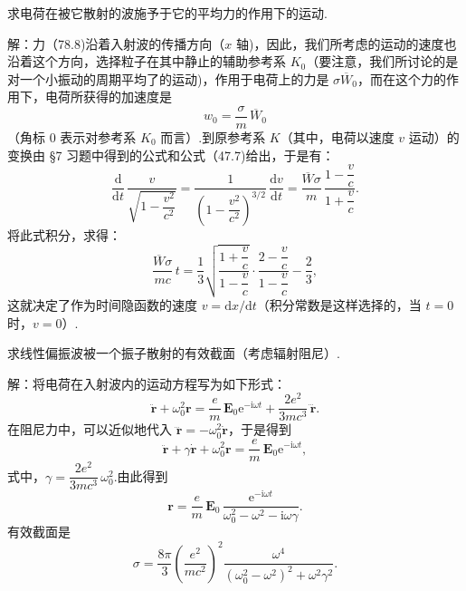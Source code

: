 \begin{xiti}
\quad 求电荷在被它散射的波施予于它的平均力的作用下的运动.

解：力（78.8)沿着入射波的传播方向（$x$ 轴)，因此，我们所考虑的运动的速度也沿着这个方向，选择粒子在其中静止的辅助参考系 $K_0$（要注意，我们所讨论的是对一个小振动的周期平均了的运动)，作用于电荷上的力是 $\sigma\overline{W}_0$，而在这个力的作用下，电荷所获得的加速度是
\begin{equation*}
  w_0=\frac{\sigma}{m}\,\overline{W}_0
\end{equation*}
（角标 0 表示对参考系 $K_0$ 而言）.到原参考系 $K$（其中，电荷以速度 $v$ 运动）的变换由 §7 习题中得到的公式和公式（47.7)给出，于是有：
\begin{equation*}
  \frac{\mathrm{d}}{\mathrm{d}t}\,\frac{v}{\sqrt{1-\dfrac{v^2}{c^2}}}
  =\frac{1}{\left(1-\dfrac{v^2}{c^2}\right)^{3/2}}\,\frac{\mathrm{d}v}{\mathrm{d}t}
  =\frac{\overline{W}\sigma}{m}\,\frac{1-\dfrac{v}{c}}{1+\dfrac{v}{c}}.
\end{equation*}
将此式积分，求得：
\begin{equation*}
  \frac{\overline{W}\sigma}{mc}\,t
  =\frac{1}{3}\sqrt{\frac{1+\dfrac{v}{c}}{1-\dfrac{v}{c}}}\cdot
  \frac{2-\dfrac{v}{c}}{1-\dfrac{v}{c}}-\frac{2}{3},
\end{equation*}
这就决定了作为时间隐函数的速度 $v=\mathrm{d}x/\mathrm{d}t$（积分常数是这样选择的，当 $t=0$ 时，$v=0$）.

\quad 求线性偏振波被一个振子散射的有效截面（考虑辐射阻尼）.

解：将电荷在入射波内的运动方程写为如下形式：
\begin{equation*}
  \ddot{\boldsymbol{r}}+\omega_0^2\boldsymbol{r}
  =\frac{e}{m}\,\boldsymbol{E}_0\mathrm{e}^{-\mathrm{i}\omega t}
  +\frac{2e^2}{3mc^3}\,\dddot{\boldsymbol{r}}.
\end{equation*}
在阻尼力中，可以近似地代入 $\dddot{\boldsymbol{r}}=-\omega_0^2\dot{\boldsymbol{r}}$，于是得到
\begin{equation*}
  \ddot{\boldsymbol{r}}+\gamma\dot{\boldsymbol{r}}+\omega_0^2\boldsymbol{r}
  =\frac{e}{m}\,\boldsymbol{E}_0\mathrm{e}^{-\mathrm{i}\omega t},
\end{equation*}
式中，$\gamma=\dfrac{2e^2}{3mc^3}\,\omega_0^2$.由此得到
\begin{equation*}
  \boldsymbol{r}=\frac{e}{m}\,\boldsymbol{E}_0\,
  \frac{\mathrm{e}^{-\mathrm{i}\omega t}}{\omega_0^2-\omega^2-\mathrm{i}\omega\gamma}.
\end{equation*}
有效截面是
\begin{equation*}
  \sigma=\frac{8\pi}{3}\left(\frac{e^2}{mc^2}\right)^{\!2}
  \frac{\omega^4}{(\omega_0^2-\omega^2)^2+\omega^2\gamma^2}.
\end{equation*}

\end{xiti}

